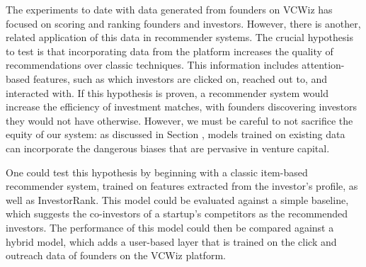 The experiments to date with data generated from founders on VCWiz has focused on scoring and ranking founders and investors. However, there is another, related application of this data in recommender systems. The crucial hypothesis to test is that incorporating data from the platform increases the quality of recommendations over classic techniques. This information includes attention-based features, such as which investors are clicked on, reached out to, and interacted with. If this hypothesis is proven, a recommender system would increase the efficiency of investment matches, with founders discovering investors they would not have otherwise. However, we must be careful to not sacrifice the equity of our system: as discussed in Section \label{ch2:matching}, models trained on existing data can incorporate the dangerous biases that are pervasive in venture capital.

One could test this hypothesis by beginning with a classic item-based recommender system, trained on features extracted from the investor's profile, as well as InvestorRank. This model could be evaluated against a simple baseline, which suggests the co-investors of a startup's competitors as the recommended investors. The performance of this model could then be compared against a hybrid model, which adds a user-based layer that is trained on the click and outreach data of founders on the VCWiz platform.
